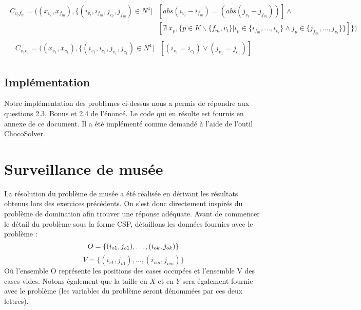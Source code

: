 \documentclass[a4paper]{article}
\begin{document}
\begin{align*}
\begin{split}
C_{v_lf_m} = ( (x_{v_l},x_{f_m}), \{ (i_{v_l},i_{f_m},j_{v_l},j_{f_m}) \in N^4 | &  [ abs(i_{v_l} - i_{f_m}) = (abs(j_{v_l} - j_{f_m})) ] \wedge \\
& [ \nexists \ x_p, \{ p \in K \backslash \{f_m,v_l\} | i_{p} \in \{ i_{f_m},...,i_{v_l} \} \wedge j_p \in \{ j_{f_m},...,j_{v_l} \}\}  ]  \} )
\end{split}
\end{align*}
\begin{align*}
\begin{split}
C_{v_1c_1} = ( (x_{v_1},x_{c_1}), \{ (i_{v_1},i_{c_1},j_{v_1},j_{c_1}) \in N^4 | &  [ (i_{v_1} = i_{c_1}) \vee(j_{v_1} = j_{c_1}) ]
\end{split}
\end{align*}

\subsection{Implémentation}
Notre implémentation des problèmes ci-dessus nous a permis de répondre aux questions 2.3, Bonus et 2.4 de l'énoncé. Le code qui en résulte est fournis en annexe de ce document. Il a été implémenté comme demandé à l'aide de l'outil \href{http://www.choco-solver.org/}{ChocoSolver}.

\section{Surveillance de musée}
La résolution du problème de musée a été réalisée en dérivant les résultats obtenus lors des exercices précédents. On s'est donc directement inspirés du problème de domination afin trouver une réponse adéquate. Avant de commencer le détail du problème sous la forme CSP, détaillons les données fournies avec le problème : 
\begin{equation*}
O = \{(i_{o1},j_{o1}),\ldots,(i_{ok},j_{ok}) \} \vspace{0.1cm} 
\end{equation*}
\begin{equation*}
V = \{ (i_{v1},j_{v1}),\ldots,(i_{vm},j_{vm}) \}
\end{equation*}
Où l'ensemble O représente les positions des cases occupées et l'ensemble V des cases vides. Notons également que la taille en $X$ et en $Y$ sera également fournie avec le problème (les variables du problème seront dénommées par ces deux lettres).
\end{document}
